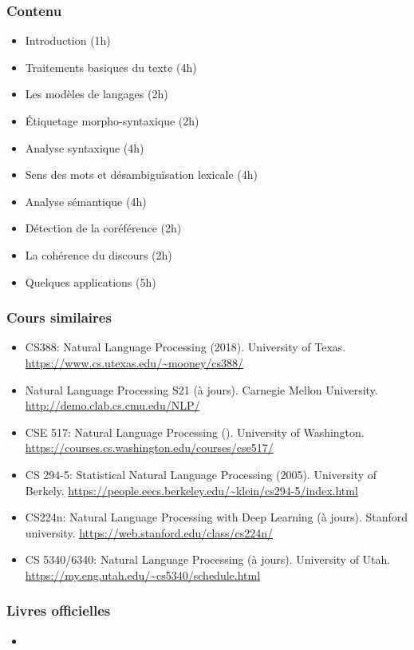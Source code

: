 \documentclass{beamer}
\begin{document}
\begin{frame}
\frametitle{Contenu}

\begin{itemize}
	\item Introduction (1h)
	\item Traitements basiques du texte (4h)
	\item Les modèles de langages (2h)
	\item Étiquetage morpho-syntaxique (2h)
	\item Analyse syntaxique (4h)
	\item Sens des mots et désambiguïsation lexicale (4h)
	\item Analyse sémantique (4h)
	\item Détection de la coréférence (2h)
	\item La cohérence du discours (2h)
	\item Quelques applications (5h)
\end{itemize}

\end{frame}

\begin{frame}
	\frametitle{Cours similaires}
	
	\begin{itemize}
		\item CS388: Natural Language Processing (2018). 
		University of Texas. 
		\url{https://www.cs.utexas.edu/~mooney/cs388/}
		
		\item Natural Language Processing S21 (à jours).
		Carnegie Mellon University. 
		\url{http://demo.clab.cs.cmu.edu/NLP/}
		
		\item CSE 517: Natural Language Processing ().
		University of Washington.
		\url{https://courses.cs.washington.edu/courses/cse517/}
		
		\item CS 294-5: Statistical Natural Language Processing (2005). 
		University of Berkely. 
		\url{https://people.eecs.berkeley.edu/~klein/cs294-5/index.html}
		
		\item CS224n: Natural Language Processing with Deep Learning (à jours).
		Stanford university.
		\url{https://web.stanford.edu/class/cs224n/}
		
		\item CS 5340/6340: Natural Language Processing (à jours). 
		University of Utah.
		\url{https://my.eng.utah.edu/~cs5340/schedule.html}
		
	\end{itemize}
	
\end{frame}

\begin{frame}
	\frametitle{Livres officielles}
	
	\begin{itemize}
		\item 
		
	\end{itemize}
	
\end{frame}
\end{document}
